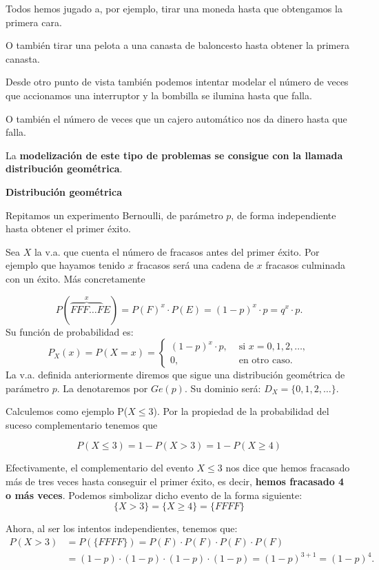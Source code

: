 \documentclass[]{book}
\begin{document}
Todos hemos jugado a, por ejemplo, tirar una moneda hasta que obtengamos la primera cara.

O también tirar una pelota a una canasta de baloncesto hasta obtener la primera canasta.

Desde otro punto de vista también podemos intentar modelar el número de veces que accionamos una interruptor y la bombilla se ilumina hasta que falla.

O también el número de veces que un cajero automático nos da dinero hasta que falla.

La \textbf{modelización de este tipo de problemas se consigue con la llamada distribución geométrica}.

\textbf{Distribución geométrica}

Repitamos un experimento Bernoulli, de parámetro \(p\), de forma independiente hasta obtener el primer éxito.

Sea \(X\) la v.a. que cuenta el número de fracasos antes del primer éxito. Por ejemplo que hayamos tenido \(x\) fracasos será una cadena de \(x\) fracasos culminada con un éxito. Más concretamente

\[P(\overbrace{FFF\ldots F}^{x}E)=P(F)^{x}\cdot P(E)=(1-p)^{x}\cdot p=q^{x}\cdot p.\]
Su función de probabilidad es:
\[
P_X(x)=P(X=x)=\left\{\begin{array}{ll}
(1-p)^{x}\cdot p, & \mbox{ si } x=0,1,2,\ldots,\\
0, &\mbox{ en otro caso.}
\end{array}\right.
\]
La v.a. definida anteriormente diremos que sigue una distribución geométrica de parámetro \(p\). La denotaremos por \(Ge(p)\).
Su dominio será: \(D_X=\{0,1,2,\ldots\}\).

Calculemos como ejemplo P(\(X\leq 3\)).
Por la propiedad de la probabilidad del suceso complementario tenemos que

\[
P(X\leq 3 )=1-P(X> 3)=1-P(X\geq 4)
\]

Efectivamente, el complementario del evento \(X\leq 3\) nos dice que hemos fracasado más de tres veces hasta conseguir el primer éxito, es decir, \textbf{hemos fracasado 4 o más veces}. Podemos simbolizar dicho evento de la forma siguiente:
\[
\{X>3\}=\{X\geq 4\}= \{FFFF\}
\]

Ahora, al ser los intentos independientes, tenemos que:
\[
\begin{array}{ll}
P(X>3) & =  P(\{FFFF\})= P(F)\cdot P(F)\cdot P(F)\cdot P(F)\\
&= (1-p)\cdot (1-p)\cdot (1-p)\cdot (1-p)= (1-p)^{3+1}=(1-p)^{4}.
\end{array}
\]
\end{document}
